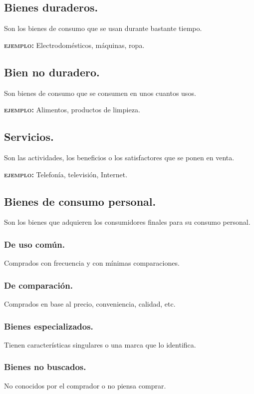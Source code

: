 \documentclass[12pt, spanish, a5paper]{article}
\begin{document}
\subsection{Bienes duraderos.}

Son los bienes de consumo que se usan durante bastante tiempo.

\textbf{\textsc{ejemplo:}} Electrodomésticos, máquinas, ropa.

\subsection{Bien no duradero.}

Son bienes de consumo que se consumen en unos cuantos usos.

\textbf{\textsc{ejemplo:}} Alimentos, productos de limpieza.

\subsection{Servicios.}

Son las actividades, los beneficios o los satisfactores que se ponen en venta.

\textbf{\textsc{ejemplo:}} Telefonía, televisión, Internet.

\subsection{Bienes de consumo personal.}

Son los bienes que adquieren los consumidores finales para su consumo personal.

\subsubsection{De uso común.}
Comprados con frecuencia y con mínimas comparaciones.

\subsubsection{De comparación.}
Comprados en base al precio, conveniencia, calidad, etc.

\subsubsection{Bienes especializados.}
Tienen características singulares o una marca que lo identifica.

\subsubsection{Bienes no buscados.}
No conocidos por el comprador o no piensa comprar.
\end{document}
